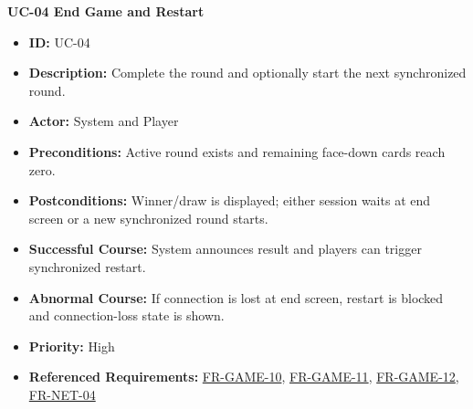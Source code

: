 \documentclass[a4paper,12pt]{article}
\newcommand{\reqref}[1]{\hyperlink{req:#1}{#1}}
\begin{document}
    \textbf{UC-04 End Game and Restart}
    \begin{itemize}[itemsep=0pt,topsep=0pt,parsep=0pt,partopsep=0pt]
        \item \textbf{ID:} UC-04
        \item \textbf{Description:} Complete the round and optionally start the next synchronized round.
        \item \textbf{Actor:} System and Player
        \item \textbf{Preconditions:} Active round exists and remaining face-down cards reach zero.
        \item \textbf{Postconditions:} Winner/draw is displayed; either session waits at end screen or a new synchronized round starts.
        \item \textbf{Successful Course:} System announces result and players can trigger synchronized restart.
        \item \textbf{Abnormal Course:} If connection is lost at end screen, restart is blocked and connection-loss state is shown.
        \item \textbf{Priority:} High
        \item \textbf{Referenced Requirements:} \reqref{FR-GAME-10}, \reqref{FR-GAME-11}, \reqref{FR-GAME-12}, \reqref{FR-NET-04}
    \end{itemize}
\end{document}
